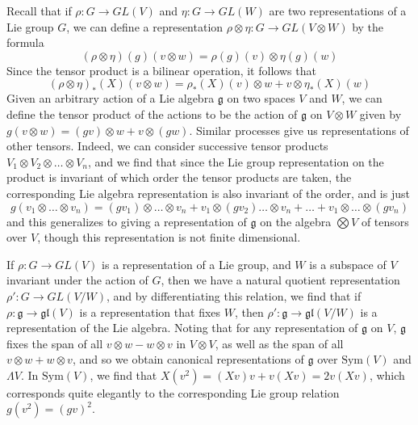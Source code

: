\begin{example}
    Recall that if $\rho: G \to GL(V)$ and $\eta: G \to GL(W)$ are two representations of a Lie group $G$, we can define a representation $\rho \otimes \eta: G \to GL(V \otimes W)$ by the formula
    \[ (\rho \otimes \eta)(g)(v \otimes w) = \rho(g)(v) \otimes \eta(g)(w) \]
    Since the tensor product is a bilinear operation, it follows that
    \[ (\rho \otimes \eta)_*(X)(v \otimes w) = \rho_*(X)(v) \otimes w + v \otimes \eta_*(X)(w) \]
    Given an arbitrary action of a Lie algebra $\mathfrak{g}$ on two spaces $V$ and $W$, we can define the tensor product of the actions to be the action of $\mathfrak{g}$ on $V \otimes W$ given by $g(v \otimes w) = (gv) \otimes w + v \otimes (gw)$. Similar processes give us representations of other tensors. Indeed, we can consider successive tensor products $V_1 \otimes V_2 \otimes \dots \otimes V_n$, and we find that since the Lie group representation on the product is invariant of which order the tensor products are taken, the corresponding Lie algebra representation is also invariant of the order, and is just
    \[ g(v_1 \otimes \dots \otimes v_n) = (gv_1) \otimes \dots \otimes v_n + v_1 \otimes (gv_2) \dots \otimes v_n + \dots + v_1 \otimes \dots \otimes (gv_n) \]
    and this generalizes to giving a representation of $\mathfrak{g}$ on the algebra $\bigotimes V$ of tensors over $V$, though this representation is not finite dimensional.
\end{example}

\begin{example}
    If $\rho: G \to GL(V)$ is a representation of a Lie group, and $W$ is a subspace of $V$ invariant under the action of $G$, then we have a natural quotient representation $\rho': G \to GL(V/W)$, and by differentiating this relation, we find that if $\rho: \mathfrak{g} \to \mathfrak{gl}(V)$ is a representation that fixes $W$, then $\rho': \mathfrak{g} \to \mathfrak{gl}(V/W)$ is a representation of the Lie algebra. Noting that for any representation of $\mathfrak{g}$ on $V$, $\mathfrak{g}$ fixes the span of all $v \otimes w - w \otimes v$ in $V \otimes V$, as well as the span of all $v \otimes w + w \otimes v$, and so we obtain canonical representations of $\mathfrak{g}$ over $\text{Sym}(V)$ and $\Lambda V$. In $\text{Sym}(V)$, we find that $X(v^2) = (Xv)v + v(Xv) = 2v(Xv)$, which corresponds quite elegantly to the corresponding Lie group relation $g(v^2) = (gv)^2$.
\end{example}

